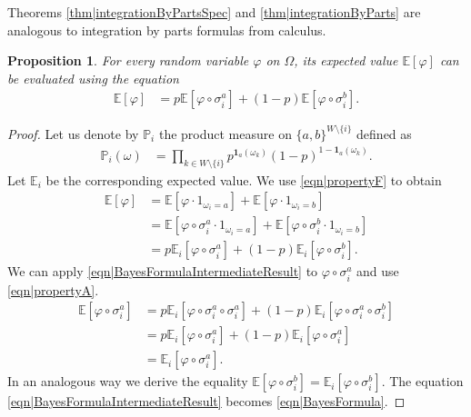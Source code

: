 \documentclass[reqno]{amsart}
\newtheorem{proposition}{Proposition}
\begin{document}
Theorems \ref{thm|integrationByPartsSpec} and \ref{thm|integrationByParts} are analogous to integration by parts formulas from calculus.

\begin{proposition}\label{thm|BayesFormula} For every random variable $\varphi$ on $\Omega$, its expected value $\mathbb E[\varphi]$ can be evaluated using 
the equation
 \begin{align}
\mathbb E\left[\varphi\right]&= p\mathbb E[\varphi\circ \sigma_i^a]+(1-p)\mathbb E[\varphi\circ \sigma_i^b]. 
\label{eqn|BayesFormula}
\end{align}
\end{proposition}
\begin{proof}
Let us denote by $\mathbb P_i$ the product measure on $\{a,b\}^{W\setminus \{i\}}$ defined as 
\begin{align*} 
\mathbb P_i(\omega)&= \prod_{k\in W\setminus\{i\}} p^{\mathbf1_a(\omega_k)}(1-p)^{1-\mathbf1_a(\omega_k)}. 
\end{align*}  Let $\mathbb  E_i$ be the corresponding expected value. We use \eqref{eqn|propertyF} to obtain  
\begin{align} \nonumber
\mathbb E[\varphi]&= \mathbb E\left[\varphi\cdot 1_{\omega_i=a}\right]+\mathbb E\left[\varphi\cdot 1_{\omega_i=b}\right]\\
\nonumber 
&= \mathbb E\left[\varphi\circ \sigma_i^a\cdot 1_{\omega_i=a}\right]+\mathbb E\left[\varphi\circ \sigma_i^b\cdot 1_{\omega_i=b}\right]\\
&=  p\mathbb E_i\left[\varphi\circ \sigma_i^a\right]+(1-p)\mathbb E_i\left[\varphi\circ \sigma_i^b\right]. \label{eqn|BayesFormulaIntermediateResult}
\end{align}
We can apply \eqref{eqn|BayesFormulaIntermediateResult} to $\varphi\circ \sigma_i^a$ and use \eqref{eqn|propertyA}.  
\begin{align*}
\mathbb E[\varphi\circ \sigma_i^a]
&= p\mathbb E_i\left[\varphi\circ \sigma_i^a\circ\sigma_i^a\right]+(1-p)\mathbb E_i\left[\varphi\circ \sigma_i^a\circ \sigma_i^b\right]\\
&= p\mathbb E_i\left[\varphi\circ \sigma_i^a\right]+(1-p)\mathbb E_i\left[\varphi\circ \sigma_i^a\right]\\
&=\mathbb E_i\left[\varphi\circ\sigma_i^a\right].
\end{align*}
 In an analogous way we derive the equality $\mathbb E\left[\varphi\circ \sigma_i^b\right]=\mathbb E_i\left[\varphi \circ\sigma_i^b\right]$. The equation \eqref{eqn|BayesFormulaIntermediateResult} becomes  \eqref{eqn|BayesFormula}. 
\end{proof}
\end{document}
